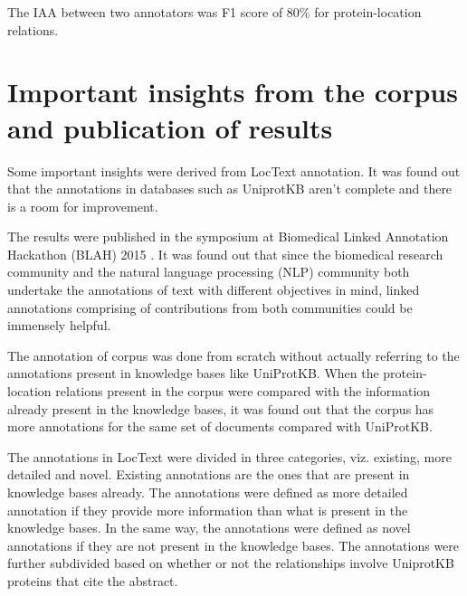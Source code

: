 The IAA between two annotators was F1 score of 80\% for protein-location relations.

\section{Important insights from the corpus and publication of results}

Some important insights were derived from LocText annotation. It was found out that the annotations in databases such as UniprotKB aren't complete and there is a room for improvement.

The results \cite{goldberg2015linked} were published in the symposium at Biomedical Linked Annotation Hackathon (BLAH) 2015 \cite{blah}. It was found out that since the biomedical research community and the natural language processing (NLP) community both undertake the annotations of text with different objectives in mind, linked annotations comprising of contributions from both communities could be immensely helpful. 

The annotation of corpus was done from scratch without actually referring to the annotations present in knowledge bases like UniProtKB. When the protein-location relations present in the corpus were compared with the information already present in the knowledge bases, it was found out that the corpus has more annotations for the same set of documents compared with UniProtKB.

The annotations in LocText were divided in three categories, viz. existing, more detailed and novel. Existing annotations are the ones that are present in knowledge bases already. The annotations were defined as more detailed annotation if they provide more information than what is present in the knowledge bases. In the same way, the annotations were defined as novel annotations if they are not present in the knowledge bases. The annotations were further subdivided based on whether or not the relationships involve UniprotKB proteins that cite the abstract.

